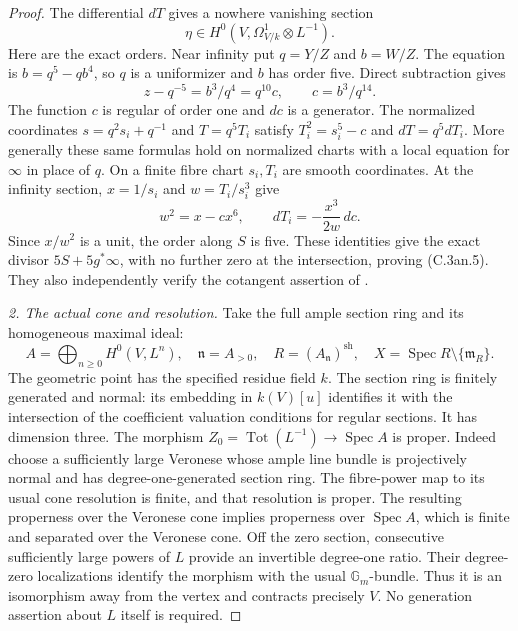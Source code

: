 \begin{proof}
The differential $dT$ gives a nowhere vanishing section
\[
               \eta\in H^0(V,\Omega^1_{V/k}\otimes L^{-1}).
                                                        \tag{C.3an.5}
\]
Here are the exact orders. Near infinity put $q=Y/Z$ and
$b=W/Z$. The equation is $b=q^5-qb^4$, so $q$ is a
uniformizer and $b$ has order five. Direct subtraction gives
\[
             z-q^{-5}=b^3/q^4=q^{10}c,\qquad c=b^3/q^{14}.
\]
The function $c$ is regular of order one and $dc$ is a
generator. The normalized coordinates
$s=q^2s_i+q^{-1}$ and $T=q^5T_i$ satisfy
$T_i^2=s_i^5-c$ and $dT=q^5dT_i$.
More generally these same formulas hold on normalized
charts with a local equation for $\infty$ in place of $q$.
On a finite fibre chart $s_i,T_i$ are smooth coordinates.
At the infinity section, $x=1/s_i$ and $w=T_i/s_i^3$ give
\[
                 w^2=x-cx^6,\qquad dT_i=-\frac{x^3}{2w}\,dc.
\]
Since $x/w^2$ is a unit, the order along $S$ is five.
These identities give the exact divisor $5S+5g^*\infty$,
with no further zero at the intersection, proving (C.3an.5).
They also independently verify the cotangent assertion of
\citet[Proposition~2.3 and equation~(25), author pp.~8,13]
{D_Mukai2011}.

\emph{2. The actual cone and resolution.}
Take the full ample section ring and its homogeneous maximal ideal:
\[
 A=\bigoplus_{n\ge0}H^0(V,L^n),\quad \mathfrak n=A_{>0},\quad
 R=(A_{\mathfrak n})^{\mathrm{sh}},\quad
 X=\operatorname{Spec}R\setminus\{\mathfrak m_R\}.
                                                        \tag{C.3an.6}
\]
The geometric point has the specified residue field $k$.
The section ring is finitely generated and normal: its
embedding in $k(V)[u]$ identifies it with the intersection
of the coefficient valuation conditions for regular sections.
It has dimension three. The morphism
$Z_0=\operatorname{Tot}(L^{-1})\to\operatorname{Spec}A$
is proper. Indeed choose a sufficiently large Veronese
whose ample line bundle is projectively normal and has
degree-one-generated section ring. The fibre-power map
to its usual cone resolution is finite, and that resolution
is proper. The resulting properness over the Veronese
cone implies properness over $\operatorname{Spec}A$, which
is finite and separated over the Veronese cone.
Off the zero section, consecutive sufficiently large
powers of $L$ provide an invertible degree-one ratio.
Their degree-zero localizations identify the morphism
with the usual $\mathbb G_m$-bundle. Thus it is an
isomorphism away from the vertex and contracts precisely $V$.
No generation assertion about $L$ itself is required.


\end{proof}

